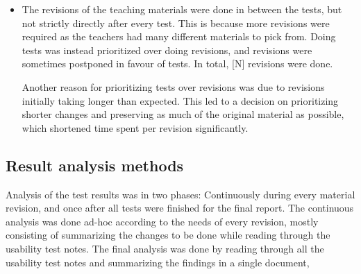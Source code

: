 \begin{itemize}
\item The revisions of the teaching materials were done in between the tests, but not strictly directly after every test. This is because more revisions were required as the teachers had many different materials to pick from. Doing tests was instead prioritized over doing revisions, and revisions were sometimes postponed in favour of tests. In total, [N] revisions were done.

Another reason for prioritizing tests over revisions was due to revisions initially taking longer than expected. This led to a decision on prioritizing shorter changes and preserving as much of the original material as possible, which shortened time spent per revision significantly.

\end{itemize}



\subsection{Result analysis methods}
Analysis of the test results was in two phases: Continuously during every material revision, and once after all tests were finished for the final report. The continuous analysis was done ad-hoc according to the needs of every revision, mostly consisting of summarizing the changes to be done while reading through the usability test notes. The final analysis was done by reading through all the usability test notes and summarizing the findings in a single document, 
  
